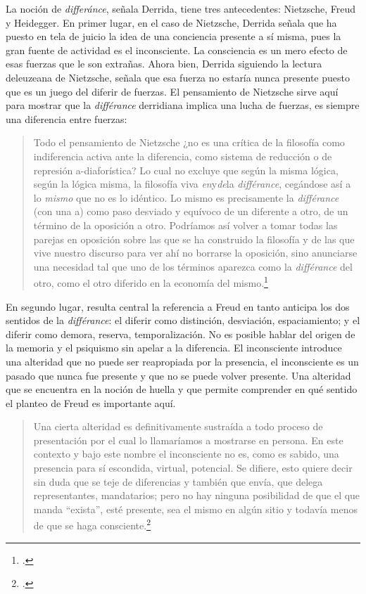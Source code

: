 La noción de \emph{differánce}, señala Derrida, tiene tres antecedentes: Nietzsche, Freud y Heidegger. En primer lugar, en el caso de Nietzsche, Derrida señala que ha puesto en tela de juicio la idea de una conciencia presente a sí misma, pues la gran fuente de actividad es el inconsciente. La consciencia es un mero efecto de esas fuerzas que le son extrañas. Ahora bien, Derrida siguiendo la lectura deleuzeana de Nietzsche, señala que esa fuerza no estaría nunca presente puesto que es un juego del diferir de fuerzas. El pensamiento de Nietzsche sirve aquí para mostrar que la \emph{différance} derridiana implica una lucha de fuerzas, es siempre una diferencia entre fuerzas:

\begin{quote}
Todo el pensamiento de Nietzsche ¿no es una crítica de la filosofía como indiferencia activa ante la diferencia, como sistema de reducción o de represión a-diaforística? Lo cual no excluye que según la misma lógica, según la lógica misma, la filosofía viva \emph{en}y\emph{de}la \emph{différance}, cegándose así a lo \emph{mismo} que no es lo idéntico. Lo mismo es precisamente la \emph{différance} (con una a) como paso desviado y equívoco de un diferente a otro, de un término de la oposición a otro. Podríamos así volver a tomar todas las parejas en oposición sobre las que se ha construido la filosofía y de las que vive nuestro discurso para ver ahí no borrarse la oposición, sino anunciarse una necesidad tal que uno de los términos aparezca como la \emph{différance} del otro, como el otro diferido en la economía del mismo.\footcite[18]{@6980-DERRIDA1989}
\end{quote}

En segundo lugar, resulta central la referencia a Freud en tanto anticipa los dos sentidos de la \emph{différance}: el diferir como distinción, desviación, espaciamiento; y el diferir como demora, reserva, temporalización. No es posible hablar del origen de la memoria y el psiquismo sin apelar a la diferencia. El inconsciente introduce una alteridad que no puede ser reapropiada por la presencia, el inconsciente es un pasado que nunca fue presente y que no se puede volver presente. Una alteridad que se encuentra en la noción de huella y que permite comprender en qué sentido el planteo de Freud es importante aquí.

\begin{quote}
Una cierta alteridad  es definitivamente sustraída a todo proceso de presentación por el cual lo llamaríamos a mostrarse en persona. En este contexto y bajo este nombre el inconsciente no es, como es sabido, una presencia para sí escondida, virtual, potencial. Se difiere, esto quiere decir sin duda que se teje de diferencias y también que envía, que delega representantes, mandatarios; pero no hay ninguna posibilidad de que el que manda \enquote{exista}, esté presente, sea el mismo en algún sitio y todavía menos de que se haga consciente.\footcite[21]{@6980-DERRIDA1989}
\end{quote}


